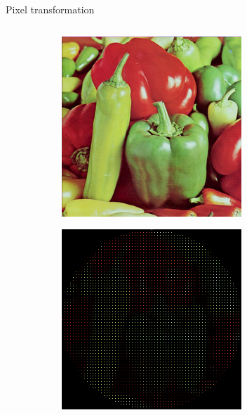 \documentclass{beamer}
\begin{document}
\begin{frame}{Pixel transformation}

\begin{columns}
    \begin{column}{0.5\textwidth}
        \begin{figure}
            \begin{subfigure}{.48\textwidth}
                \centering
            \includegraphics[width=\textwidth]{figures/pepper_color_256.png}
            \end{subfigure}
            \begin{subfigure}{.48\textwidth}
                \centering
            \includegraphics[width=\textwidth]{figures/pepper_square.png}

\end{subfigure}
\end{figure}
\end{column}
\end{columns}
\end{frame}
\end{document}

